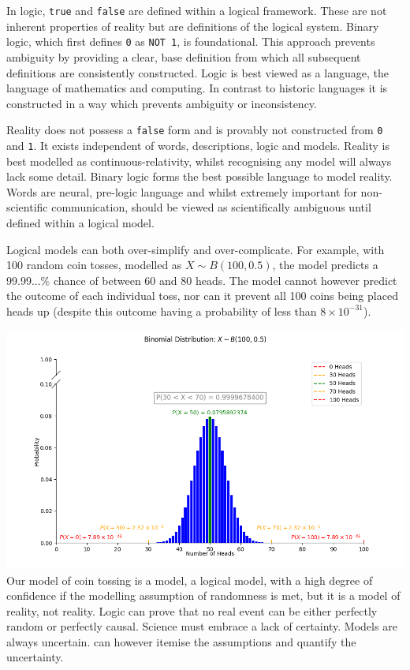 \documentclass[12pt]{article}
\begin{document}
In logic, \texttt{true} and \texttt{false} are defined within a logical framework. These are not inherent properties of reality but are definitions of the logical system. Binary logic, which first defines \texttt{0} as \texttt{NOT 1}, is foundational. This approach prevents ambiguity by providing a clear, base definition from which all subsequent definitions are consistently constructed. Logic is best viewed as a language, the language of mathematics and computing. In contrast to historic languages it is constructed in a way which prevents ambiguity or inconsistency.

Reality does not possess a \texttt{false} form and is provably not constructed from \texttt{0} and \texttt{1}. It exists independent of words, descriptions, logic and models. Reality is best modelled as continuous-relativity, whilst recognising any model will always lack some detail. Binary logic forms the best possible language to model reality. Words are neural, pre-logic language and whilst extremely important for non-scientific communication, should be viewed as scientifically ambiguous until defined within a logical model.

Logical models can both over-simplify and over-complicate. For example, with 100 random coin tosses, modelled as \( X \sim B(100,0.5) \), the model predicts a 99.99...\% chance of between 60 and 80 heads. The model cannot however predict the outcome of each individual toss, nor can it prevent all 100 coins being placed heads up (despite this outcome having a probability of less than  \( 8 \times 10^{-31} \)).

\includegraphics[width=\textwidth]{binomial.png}
Our model of coin tossing is a model, a logical model, with a high degree of confidence if the modelling assumption of randomness is met, but it is a model of reality, not reality. Logic can prove that no real event can be either perfectly random or perfectly causal. Science must embrace a lack of certainty. Models are always uncertain. \iR{} can however itemise the assumptions and quantify the uncertainty.
\end{document}
